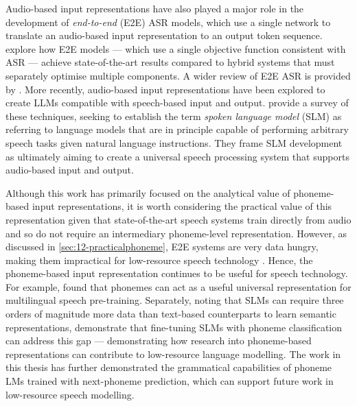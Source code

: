 Audio-based input representations have also played a major role in the development of \emph{end-to-end} (E2E) ASR models, which use a single network to translate an audio-based input representation to an output token sequence. \citet{li2022recent} explore how E2E models --- which use a single objective function consistent with ASR --- achieve state-of-the-art results compared to hybrid systems that must separately optimise multiple components. A wider review of E2E ASR is provided by \citet{prabhavalkar2023end}. More recently, audio-based input representations have been explored to create LLMs compatible with speech-based input and output. \citet{arora2025landscapespokenlanguagemodels} provide a survey of these techniques, seeking to establish the term \emph{spoken language model} (SLM) as referring to language models that are in principle capable of performing arbitrary speech tasks given natural language instructions. They frame SLM development as ultimately aiming to create a universal speech processing system that supports audio-based input and output.

Although this work has primarily focused on the analytical value of phoneme-based input representations, it is worth considering the practical value of this representation given that state-of-the-art speech systems train directly from audio and so do not require an intermediary phoneme-level representation. However, as discussed in \cref{sec:12-practicalphoneme}, E2E systems are very data hungry, making them impractical for low-resource speech technology \citet{li2022recent}. Hence, the phoneme-based input representation continues to be useful for speech technology. For example, \citet{feng-2023-language-universal-phonetic} found that phonemes can act as a useful universal representation for multilingual speech pre-training. Separately, noting that SLMs can require three orders of magnitude more data than text-based counterparts to learn semantic representations, \citet{poli2024improving} demonstrate that fine-tuning SLMs with phoneme classification can address this gap --- demonstrating how research into phoneme-based representations can contribute to low-resource language modelling. The work in this thesis has further demonstrated the grammatical capabilities of phoneme LMs trained with next-phoneme prediction, which can support future work in low-resource speech modelling.


